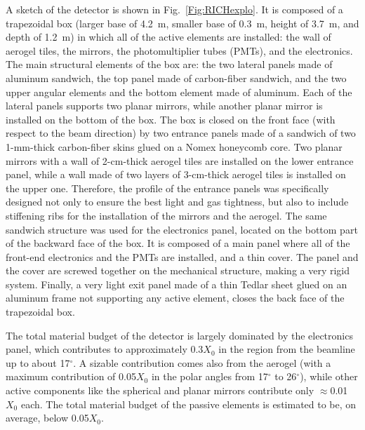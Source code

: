 \documentclass[5p,times,twocolumn]{elsarticle}
\begin{document}
A sketch of the detector is shown in Fig.~\ref{Fig:RICHexplo}. It is composed of a trapezoidal box (larger base of
4.2~m, smaller base of 0.3~m, height of 3.7~m, and depth of 1.2~m) in which all of the active elements are installed:
the wall of aerogel tiles, the mirrors, the photomultiplier tubes (PMTs), and the electronics. The main structural elements of
the box are: the two lateral panels made of aluminum sandwich, the top panel made of carbon-fiber sandwich, and the
two upper angular elements and the bottom element made of aluminum. Each of the lateral panels supports two planar
mirrors, while another planar mirror is installed on the bottom of the box. The box is closed on the front face (with
respect to the beam direction) by two entrance panels made of a sandwich of two 1-mm-thick carbon-fiber skins glued on a
Nomex honeycomb core. Two planar mirrors with a wall of 2-cm-thick aerogel tiles are installed on the lower entrance panel, while
a wall made of two layers of 3-cm-thick aerogel tiles is installed on the upper one. Therefore, the profile of the entrance panels
was specifically designed not only to ensure the best light and gas tightness, but also to include stiffening ribs for
the installation of the mirrors and the aerogel. The same sandwich structure was used for the electronics panel, located
on the bottom part of the backward face of the box. It is composed of a main panel where all of the front-end electronics
and the PMTs are installed, and a thin cover. The panel and the cover are screwed together on the mechanical
structure, making a very rigid system. Finally, a very light exit panel made of a thin Tedlar sheet glued on an aluminum
frame not supporting any active element, closes the back face of the trapezoidal box. 

The total material budget of the detector is largely dominated by the electronics panel, which contributes to
approximately 0.3$X_0$ in the region from the beamline up to about 17$^\circ$. A sizable contribution comes also
from the aerogel (with a maximum contribution of 0.05$X_0$ in the polar angles from 17$^\circ$ to 26$^\circ$),
while other active components like the spherical and planar mirrors contribute only $\approx$0.01$X_0$ each.
The total material budget of the passive elements is estimated to be, on average, below 0.05$X_0$.
\end{document}
